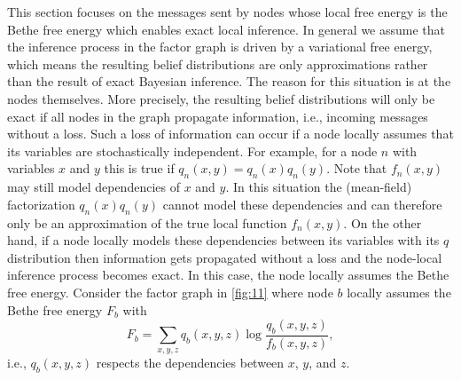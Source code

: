 This section focuses on the messages sent by nodes whose local free energy is the Bethe free energy which enables exact local inference. In general we assume that the inference process in the factor graph is driven by a variational free energy, which means the resulting belief distributions are only approximations rather than the result of exact Bayesian inference. The reason for this situation is at the nodes themselves. More precisely, the resulting belief distributions will only be exact if all nodes in the graph propagate information, i.e., incoming messages without a loss. Such a loss of information can occur if a node locally assumes that its variables are stochastically independent. For example, for a node \(n\) with variables \(x\) and \(y\) this is true if \(q_n(x,y) = q_n(x)q_n(y)\). Note that \(f_n(x,y)\) may still model dependencies of \(x\) and \(y\). In this situation the (mean-field) factorization \(q_n(x)q_n(y)\) cannot model these dependencies and can therefore only be an approximation of the true local function \(f_n(x,y)\). On the other hand, if a node locally models these dependencies between its variables with its \(q\) distribution then information gets propagated without a loss and the node-local inference process becomes exact. In this case, the node locally assumes the Bethe free energy. Consider the factor graph in \cref{fig:11} where node \(b\) locally assumes the Bethe free energy \(F_b\) with
\begin{equation}
    F_b = \sum_{x,y,z} q_b(x,y,z) \log \frac{q_b(x,y,z)}{f_b(x,y,z)},
\end{equation}
i.e., \(q_b(x,y,z)\) respects the dependencies between \(x\), \(y\), and \(z\).
